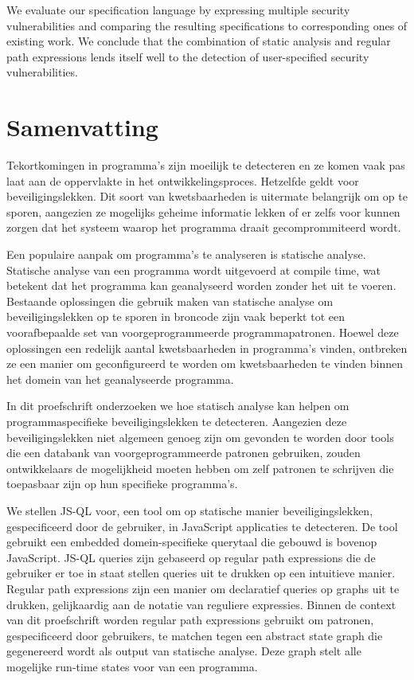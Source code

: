 \documentclass[a4paper, 12pt]{report}
\theoremstyle{definition}
\begin{document}
We evaluate our specification language by expressing multiple security vulnerabilities and comparing the resulting specifications to corresponding ones of existing work. We conclude that the combination of static analysis and regular path expressions lends itself well to the detection of user-specified security vulnerabilities.

\chapter*{Samenvatting}

Tekortkomingen in programma's zijn moeilijk te detecteren en ze komen vaak pas laat aan de oppervlakte in het ontwikkelingsproces. Hetzelfde geldt voor beveiligingslekken. Dit soort van kwetsbaarheden is uitermate belangrijk om op te sporen, aangezien ze mogelijks geheime informatie lekken of er zelfs voor kunnen zorgen dat het systeem waarop het programma draait gecomprommiteerd wordt.
 
Een populaire aanpak om programma's te analyseren is statische analyse. Statische analyse van een programma wordt uitgevoerd at compile time, wat betekent dat het programma kan geanalyseerd worden zonder het uit te voeren. Bestaande oplossingen die gebruik maken van statische analyse om beveiligingslekken op te sporen in broncode zijn vaak beperkt tot een voorafbepaalde set van voorgeprogrammeerde programmapatronen. Hoewel deze oplossingen een redelijk aantal kwetsbaarheden in programma's vinden, ontbreken ze een manier om geconfigureerd te worden om kwetsbaarheden te vinden binnen het domein van het geanalyseerde programma.

In dit proefschrift onderzoeken we hoe statisch analyse kan helpen om programmaspecifieke beveiligingslekken te detecteren. Aangezien deze beveiligingslekken niet algemeen genoeg zijn om gevonden te worden door tools die een databank van voorgeprogrammeerde patronen gebruiken, zouden ontwikkelaars de mogelijkheid moeten hebben om zelf patronen te schrijven die toepasbaar zijn op hun specifieke programma's.

\begin{sloppypar}
We stellen JS-QL voor, een tool om op statische manier beveiligingslekken, gespecificeerd door de gebruiker, in JavaScript applicaties te detecteren. De tool gebruikt een embedded domein-specifieke querytaal die gebouwd is bovenop JavaScript. JS-QL queries zijn gebaseerd op regular path expressions die de gebruiker er toe in staat stellen queries uit te drukken op een intuitieve manier. Regular path expressions zijn een manier om declaratief queries op graphs uit te drukken, gelijkaardig aan de notatie van reguliere expressies. Binnen de context van dit proefschrift worden regular path expressions gebruikt om patronen, gespecificeerd door gebruikers, te matchen tegen een abstract state graph die gegenereerd wordt als output van statische analyse. Deze graph stelt alle mogelijke run-time states voor van een programma.
\end{sloppypar}
\end{document}
